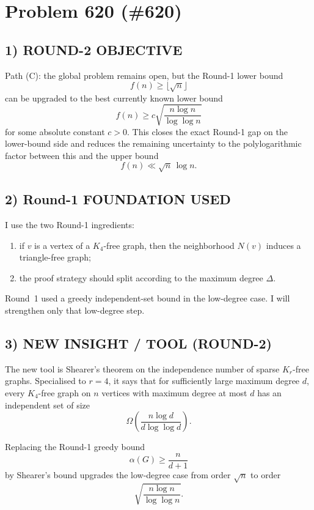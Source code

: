 
\section{Problem 620 (\#620)}

\subsection*{1) ROUND-2 OBJECTIVE}

Path (C): the global problem remains open, but the Round-1 lower bound
\[
f(n)\ge \lfloor \sqrt n\rfloor
\]
can be upgraded to the best currently known lower bound
\[
f(n)\ge c\sqrt{\frac{n\log n}{\log\log n}}
\]
for some absolute constant $c>0$. This closes the exact Round-1 gap on the lower-bound side and reduces the remaining uncertainty to the polylogarithmic factor between this and the upper bound
\[
f(n)\ll \sqrt n\,\log n.
\]

\subsection*{2) Round-1 FOUNDATION USED}

I use the two Round-1 ingredients:

\begin{enumerate}
\item if $v$ is a vertex of a $K_4$-free graph, then the neighborhood $N(v)$ induces a triangle-free graph;
\item the proof strategy should split according to the maximum degree $\Delta$.
\end{enumerate}

Round~1 used a greedy independent-set bound in the low-degree case. I will strengthen only that low-degree step.

\subsection*{3) NEW INSIGHT / TOOL (ROUND-2)}

The new tool is Shearer's theorem on the independence number of sparse $K_r$-free graphs. Specialised to $r=4$, it says that for sufficiently large maximum degree $d$, every $K_4$-free graph on $n$ vertices with maximum degree at most $d$ has an independent set of size
\[
\Omega\!\left(\frac{n\log d}{d\log\log d}\right).
\]

Replacing the Round-1 greedy bound
\[
\alpha(G)\ge \frac{n}{d+1}
\]
by Shearer's bound upgrades the low-degree case from order $\sqrt n$ to order
\[
\sqrt{\frac{n\log n}{\log\log n}}.
\]

